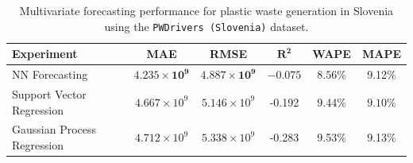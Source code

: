 \begin{table}[!ht]
	\centering
	\caption{\centering Multivariate forecasting performance for plastic waste generation in Slovenia using the \texttt{PWDrivers (Slovenia)} dataset.}
	\begin{tabular}{@{}lccccc@{}}
		\toprule
		\textbf{Experiment}         & \textbf{MAE}                   & \textbf{RMSE}                  & $\mathbf{R^2}$      & \textbf{WAPE}       & \textbf{MAPE}       \\
		\midrule
		NN Forecasting              & \(\mathbf{4.235 \times 10^9}\) & \(\mathbf{4.887 \times 10^9}\) & \(\mathbf{-0.075}\) & \(\mathbf{8.56}\)\% & 9.12\%              \\
		Support Vector Regression   & \(4.667 \times 10^9\)          & \(5.146 \times 10^9\)          & -0.192              & 9.44\%              & \(\mathbf{9.10}\)\% \\
		Gaussian Process Regression & \(4.712 \times 10^9\)          & \(5.338 \times 10^9\)          & -0.283              & 9.53\%              & 9.13\%              \\
		\hline
	\end{tabular}
	\label{tab:multivariate_forecasting_slovenia_metric_table}
\end{table}
